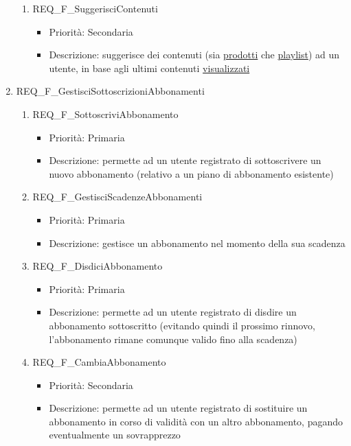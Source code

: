\begin{enumerate}
\begin{enumerate}[label*=\arabic*.]
		\item REQ\_F\_SuggerisciContenuti
			\begin{itemize}	
			\item Priorità: Secondaria
			\item Descrizione: suggerisce dei contenuti (sia \hyperlink{AnReqProdMult}{prodotti} che \hyperlink{AnReqPlaylist}{playlist})  ad un utente, in base agli ultimi contenuti \hyperlink{AnReqVisual}{visualizzati}
			\end{itemize}
		\end{enumerate}		

	\item REQ\_F\_GestisciSottoscrizioniAbbonamenti
		\begin{enumerate}[label*=\arabic*.]			
		\item REQ\_F\_SottoscriviAbbonamento
			\begin{itemize}
			\item Priorità: Primaria	
			\item Descrizione: permette ad un utente registrato di sottoscrivere un nuovo abbonamento (relativo a un piano di abbonamento esistente)
			\end{itemize}

		\item REQ\_F\_GestisciScadenzeAbbonamenti
			\begin{itemize}
			\item Priorità: Primaria
			\item Descrizione: gestisce un abbonamento nel momento della sua scadenza
			\end{itemize}

		\item REQ\_F\_DisdiciAbbonamento
			\begin{itemize}	
			\item Priorità: Primaria
			\item Descrizione: permette ad un utente registrato di disdire un abbonamento sottoscritto (evitando quindi il prossimo rinnovo, l'abbonamento rimane comunque valido fino alla scadenza)
			\end{itemize}
				
		\item REQ\_F\_CambiaAbbonamento
			\begin{itemize}	
			\item Priorità: Secondaria
			\item Descrizione: permette ad un utente registrato di sostituire un abbonamento in corso di validità con un altro abbonamento, pagando eventualmente un sovrapprezzo
			\end{itemize}
		\end{enumerate}
	

\end{enumerate}
